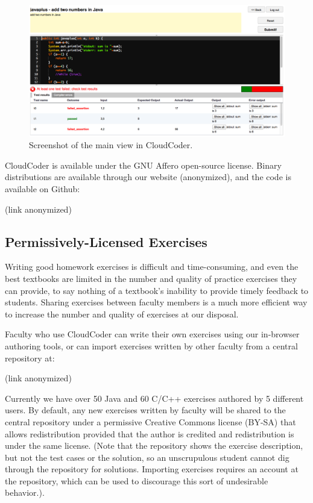 \documentclass{sig-alternate}
\begin{document}
\begin{figure}[ht]
\centering
\includegraphics[width=180mm]{images/screenshot}
\caption{Screenshot of the main view in CloudCoder.}
\label{screenshot}
\end{figure}

CloudCoder is available under the GNU Affero open-source license.
Binary distributions are available through our website (anonymized),
and the code is available on Github:

\vspace*{3mm} 
(link anonymized)
\vspace*{3mm}


\subsection{Permissively-Licensed Exercises}

Writing good homework exercises is difficult and
time-consuming, and even the best textbooks are limited in the
number and quality of practice exercises they can provide, to say
nothing of a textbook's inability to provide timely feedback to
students.
Sharing exercises between faculty members is a much
more efficient way to increase the number and quality of exercises at
our disposal.

Faculty who use CloudCoder can write their own exercises using our in-browser
authoring tools, or can import exercises written by other faculty
from a central repository at:

\vspace*{3mm} 
(link anonymized)
\vspace*{3mm} 

Currently we have over 50 Java and 60 C/C++ exercises authored by 5
different users.  By default,
any new exercises written by faculty will be shared to the 
central repository under a permissive Creative Commons license (BY-SA)
that allows redistribution provided that the author is credited and
redistribution is under the same license.  
(Note that the repository shows the exercise description, but not the
test cases or the solution, so an unscrupulous student cannot dig through the
repository for solutions.  Importing exercises requires an account at
the repository, which can be used to discourage this sort of
undesirable behavior.).
\end{document}
